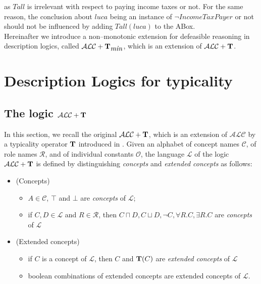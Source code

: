 \documentclass[a4paper, 11pt, oneside]{duthesis}
\newcommand{\tip}{{\bf T}}
\newcommand{\alc}{\mathcal{ALC}}
\newcommand{\alct}{\mathcal{ALC}+\tip}
\newcommand{\alctmin}{\mathcal{ALC}+\tip_{\mbox{\em min}}}
\newcommand{\vero} {\top}
\newcommand{\elle} {\mathcal{L}}
\begin{document}
\noindent as  $\mathit{Tall}$ is irrelevant with respect to paying income taxes or not. For the same reason, the conclusion about $\mathit{luca}$ being an instance of $\neg IncomeTaxPayer$ or not should not be influenced by adding $\mathit{Tall}(\mathit{luca})$ to the ABox.\\

Hereinafter we introduce a non--monotonic extension for defeasible reasoning in description logics, called $\alctmin$, which is an extension of $\alct$.


\newpage


\chapter{Description Logics for typicality}\label{dlt}

\section{The logic $\alct$}\label{alct}


In this section, we recall the original $\alct$, which is an extension of $\alc$ by a typicality operator $\tip$ introduced in \cite{FI09}. Given an alphabet of concept names $\mathcal{C}$, of role names $\mathcal{R}$, and of individual constants $\mathcal{O}$, the language $\elle$ of the logic $\alct$ is defined by distinguishing \emph{concepts} and \emph{extended concepts} as follows:

\begin{itemize}
\item (Concepts)
  \begin{itemize}
     \item $A \in \mathcal{C}$, $\vero$ and $\bot$ are \emph{concepts} of
$\elle$;
    \item if $C, D \in \elle$ and $R \in \mathcal{R}$, then $C
\sqcap D, C \sqcup D, \neg C, \forall R.C, \exists R.C$ are
\emph{concepts} of $\elle$
  \end{itemize}
\item (Extended concepts)
    \begin{itemize}
       \item if $C$ is a
concept of $\elle$, then $C$ and $\tip(C)$ are \emph{extended concepts} of $\elle$
     \item boolean combinations of extended concepts are extended
concepts of $\elle$.
    \end{itemize}
\end{itemize}
\end{document}
